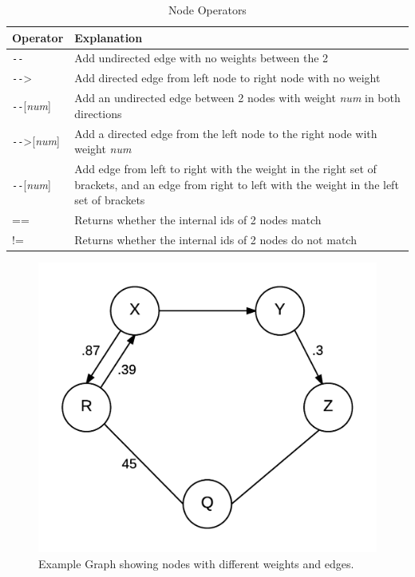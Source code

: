 \documentclass{article}
\begin{document}
\begin{table}[H]
\centering
\begin{tabular}{| p{1.5in} | p{2.75in} |}
\hline
Operator & Explanation \\
\hline
\texttt{-{}-} & Add undirected edge with no weights between the 2 \\
\hline
\texttt{-{}-}> & Add directed edge from left node to right node with no weight \\
\hline
\texttt{-{}-}[\emph{num}] & Add an undirected edge between 2 nodes with weight \emph{num} in both directions \\
\hline
\texttt{-{}-}>[\emph{num}] & Add a directed edge from the left node to the right node with weight \emph{num} \\
\hline
[\emph{num}]\texttt{-{}-}[\emph{num}] & Add edge from left to right with the weight in the right set of brackets, and an edge from right to left with the weight in the left set of brackets \\
\hline
== & Returns whether the internal ids of 2 nodes match \\
\hline
!= & Returns whether the internal ids of 2 nodes do not match \\
\hline
\end{tabular}
\caption{Node Operators}
\label{tbl:node-ops}
\end{table}

\begin{figure}[H]
\centering
\includegraphics{graphs/node_operators_example.png}
\caption{Example Graph showing nodes with different weights and edges.}
\label{fig:node-ops}
\end{figure}
\end{document}

